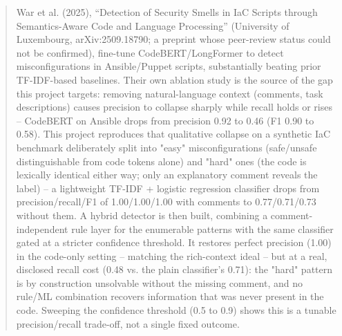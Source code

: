 \begin{abstract}
War et al. (2025), ``Detection of Security Smells in IaC Scripts through Semantics-Aware Code and Language Processing'' (University of Luxembourg, arXiv:2509.18790; a preprint whose peer-review status could not be confirmed), fine-tune CodeBERT/LongFormer to detect misconfigurations in Ansible/Puppet scripts, substantially beating prior TF-IDF-based baselines. Their own ablation study is the source of the gap this project targets: removing natural-language context (comments, task descriptions) causes precision to collapse sharply while recall holds or rises -- CodeBERT on Ansible drops from precision 0.92 to 0.46 (F1 0.90 to 0.58). This project reproduces that qualitative collapse on a synthetic IaC benchmark deliberately split into "easy" misconfigurations (safe/unsafe distinguishable from code tokens alone) and "hard" ones (the code is lexically identical either way; only an explanatory comment reveals the label) -- a lightweight TF-IDF + logistic regression classifier drops from precision/recall/F1 of 1.00/1.00/1.00 with comments to 0.77/0.71/0.73 without them. A hybrid detector is then built, combining a comment-independent rule layer for the enumerable patterns with the same classifier gated at a stricter confidence threshold. It restores perfect precision (1.00) in the code-only setting -- matching the rich-context ideal -- but at a real, disclosed recall cost (0.48 vs. the plain classifier's 0.71): the "hard" pattern is by construction unsolvable without the missing comment, and no rule/ML combination recovers information that was never present in the code. Sweeping the confidence threshold (0.5 to 0.9) shows this is a tunable precision/recall trade-off, not a single fixed outcome.
\end{abstract}
